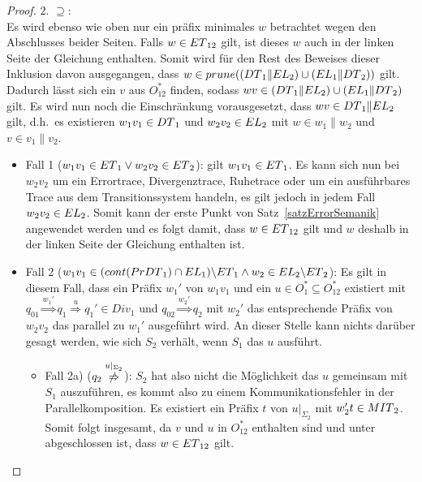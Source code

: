 \begin{proof}
  2. \glqq{}$\supseteq$\grqq{}:\\
  Es wird ebenso wie oben nur ein präfix minimales $w$ betrachtet wegen den
  Abschlusses beider Seiten. Falls $w\in ET{}_{12}$ gilt, ist dieses $w$ auch
  in der linken Seite der Gleichung enthalten. Somit wird für den Rest des
  Beweises dieser Inklusion davon ausgegangen, dass
  $w\in prune{}((DT{}_1\|EL{}_2)\cup (EL{}_1\|DT{}_2))$ gilt. Dadurch lässt
  sich ein $v$ aus $O_{12}^*$ finden, sodass $wv\in (DT{}_1\|EL{}_2)\cup
  (EL{}_1\|DT{}_2)$ gilt. Es wird nun noch die Einschränkung vorausgesetzt,
  dass \oBdA{} $wv\in DT{}_1\|EL{}_2$ gilt, d.h.\ es existieren
  $w_1v_1\in DT{}_1$ und $w_2v_2\in EL{}_2$ mit $w\in w_1\|w_2$ und $v\in
  v_1\|v_2$.
  \begin{itemize}
    \item Fall 1 ($w_1v_1\in ET{}_1 \vee w_2v_2\in ET{}_2$): \OBdA{} gilt
      $w_1v_1\in ET{}_1$. Es kann sich nun bei $w_2v_2$ um ein Errortrace,
      Divergenztrace, Ruhetrace oder um ein ausführbares Trace aus dem
      Transitionssystem handeln, es gilt jedoch in jedem Fall $w_2v_2\in EL{}_2$.
      Somit kann der erste Punkt von Satz~\ref{satzErrorSemanik} angewendet
      werden und es folgt damit, dass $w\in ET{}_{12}$ gilt und $w$ deshalb in
      der linken Seite der Gleichung enthalten ist.
    \item Fall 2 ($w_1v_1\in (cont{}(PrDT{}_1)\cap EL_1)\backslash ET{}_1
      \wedge w_2\in EL{}_2\backslash ET{}_2$): Es gilt in diesem Fall, dass
      ein Präfix $w_1'$ von $w_1v_1$ und ein $u\in O_1^*\subseteq O_{12}^*$
      existiert mit $q_{01} \overset{w_1'}{\Rightarrow} q_1
      \overset{u}{\Rightarrow} q_1'\in Div_1$ und $q_{02}
      \overset{w_2'}{\Rightarrow} q_2$ mit $w_2'$ das entsprechende Präfix von
      $w_2v_2$ das parallel zu $w_1'$ ausgeführt wird. An dieser Stelle kann
      nichts darüber gesagt werden, wie sich $S_2$ verhält, wenn $S_1$ das $u$
      ausführt.
      \begin{itemize}
        \item Fall 2a) \Big($q_2 \overset{u|_{\Sigma
          _2}}{\not{\hspace{-0.1cm}\Rightarrow}}$\Big): $S_2$ hat also nicht die
          Möglichkeit das $u$ gemeinsam mit $S_1$ auszuführen, es kommt also zu
          einem Kommunikationsfehler in der Parallelkomposition. Es existiert
          ein Präfix $t$ von $u|_{\Sigma _2}$ mit $w_2't\in MIT{}_2$. Somit
          folgt insgesamt, da $v$ und $u$ in $O_{12}^*$ enthalten sind und
          \ET{} unter \cont{} abgeschlossen ist, dass $w\in ET{}_{12}$ gilt.

\end{itemize}
\end{itemize}
\end{proof}
